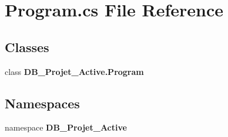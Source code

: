 \section{Program.\+cs File Reference}
\label{_program_8cs}
\subsection*{Classes}
\begin{DoxyCompactItemize}
\item 
class {\bfseries D\+B\+\_\+\+Projet\+\_\+\+Active.\+Program}
\end{DoxyCompactItemize}
\subsection*{Namespaces}
\begin{DoxyCompactItemize}
\item 
namespace \textbf{ D\+B\+\_\+\+Projet\+\_\+\+Active}
\end{DoxyCompactItemize}
